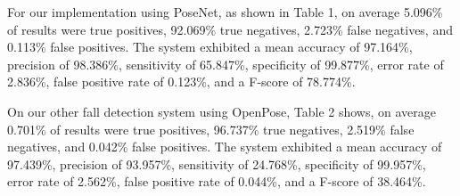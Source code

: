 




For our implementation using PoseNet, as shown in Table 1, on average 5.096\% of results were true positives, 92.069\% true negatives, 2.723\% false negatives, and 0.113\% false positives. The system exhibited a mean accuracy of 97.164\%, precision of 98.386\%, sensitivity of 65.847\%, specificity of 99.877\%, error rate of 2.836\%, false positive rate of 0.123\%, and a F-score of 78.774\%.


On our other fall detection system using OpenPose, Table 2 shows, on average 0.701\% of results were true positives, 96.737\% true negatives, 2.519\% false negatives, and 0.042\% false positives. The system exhibited a mean accuracy of 97.439\%, precision of 93.957\%, sensitivity of 24.768\%, specificity of 99.957\%, error rate of 2.562\%, false positive rate of 0.044\%, and a F-score of 38.464\%.


